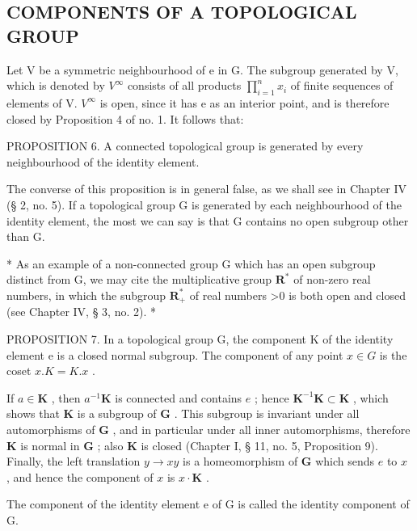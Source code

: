 \subsection{COMPONENTS OF A TOPOLOGICAL GROUP}

Let V be a symmetric neighbourhood of e in G. The subgroup generated by V, which is denoted by \(V^{\infty}\) consists of all products \(\prod_{i=1}^{n} x_{i}\) of finite sequences of elements of V. \(V^{\infty}\) is open, since it has e as an interior point, and is therefore closed by Proposition 4 of no. 1. It follows that:

PROPOSITION 6. A connected topological group is generated by every neighbourhood of the identity element.

The converse of this proposition is in general false, as we shall see in Chapter IV (§ 2, no. 5). If a topological group G is generated by each neighbourhood of the identity element, the most we can say is that G contains no open subgroup other than G.

* As an example of a non-connected group G which has an open subgroup distinct from G, we may cite the multiplicative group \(\mathbf{R}^{*}\) of non-zero real numbers, in which the subgroup \(\mathbf{R}_{+}^{*}\) of real numbers \textgreater0 is both open and closed (see Chapter IV, § 3, no. 2). *

PROPOSITION 7. In a topological group G, the component K of the identity element e is a closed normal subgroup. The component of any point \(x \in G\) is the coset \(x.K = K.x\) .

If \(a \in \mathbf{K}\) , then \(a^{-1}\mathbf{K}\) is connected and contains \(e\) ; hence \(\mathbf{K}^{-1}\mathbf{K} \subset \mathbf{K}\) , which shows that \(\mathbf{K}\) is a subgroup of \(\mathbf{G}\) . This subgroup is invariant under all automorphisms of \(\mathbf{G}\) , and in particular under all inner automorphisms, therefore \(\mathbf{K}\) is normal in \(\mathbf{G}\) ; also \(\mathbf{K}\) is closed (Chapter I, § 11, no. 5, Proposition 9). Finally, the left translation \(y \to xy\) is a homeomorphism of \(\mathbf{G}\) which sends \(e\) to \(x\) , and hence the component of \(x\) is \(x\cdot \mathbf{K}\) .

The component of the identity element e of G is called the identity component of G.

